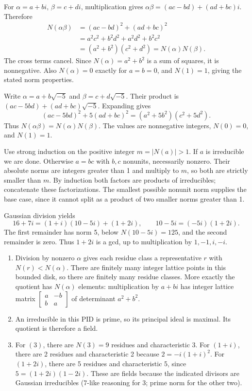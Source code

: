 For $\alpha=a+bi$, $\beta=c+di$, multiplication gives $\alpha\beta=(ac-bd)+(ad+bc)i$. Therefore
\begin{align*}
N(\alpha\beta)&=(ac-bd)^2+(ad+bc)^2\\
&=a^2c^2+b^2d^2+a^2d^2+b^2c^2\\
&=(a^2+b^2)(c^2+d^2)=N(\alpha)N(\beta).
\end{align*}
The cross terms cancel. Since $N(\alpha)=a^2+b^2$ is a sum of squares, it is nonnegative. Also $N(\alpha)=0$ exactly for $a=b=0$, and $N(1)=1$, giving the stated norm properties.

Write $\alpha=a+b\sqrt{-5}$ and $\beta=c+d\sqrt{-5}$. Their product is $(ac-5bd)+(ad+bc)\sqrt{-5}$. Expanding gives
\[(ac-5bd)^2+5(ad+bc)^2=(a^2+5b^2)(c^2+5d^2).\]
Thus $N(\alpha\beta)=N(\alpha)N(\beta)$. The values are nonnegative integers, $N(0)=0$, and $N(1)=1$.

Use strong induction on the positive integer $m=|N(a)|>1$. If $a$ is irreducible we are done. Otherwise $a=bc$ with $b,c$ nonunits, necessarily nonzero. Their absolute norms are integers greater than 1 and multiply to $m$, so both are strictly smaller than $m$. By induction both factors are products of irreducibles; concatenate these factorizations. The smallest possible nonunit norm supplies the base case, since it cannot split as a product of two smaller norms greater than 1.

Gaussian division yields
\[16+7i=(1+i)(10-5i)+(1+2i),\qquad 10-5i=(-5i)(1+2i).\]
The first remainder has norm 5, below $N(10-5i)=125$, and the second remainder is zero. Thus $1+2i$ is a gcd, up to multiplication by $1,-1,i,-i$.

\begin{enumerate}[label=(\alph*)]
\item Division by nonzero $\alpha$ gives each residue class a representative $r$ with $N(r)<N(\alpha)$. There are finitely many integer lattice points in this bounded disk, so there are finitely many residue classes. More exactly the quotient has $N(\alpha)$ elements: multiplication by $a+bi$ has integer lattice matrix $\left[\begin{smallmatrix}a&-b\\b&a\end{smallmatrix}\right]$ of determinant $a^2+b^2$.
\item An irreducible in this PID is prime, so its principal ideal is maximal. Its quotient is therefore a field.
\item For $(3)$, there are $N(3)=9$ residues and characteristic 3. For $(1+i)$, there are 2 residues and characteristic 2 because $2=-i(1+i)^2$. For $(1+2i)$, there are 5 residues and characteristic 5, since $5=(1+2i)(1-2i)$. These are fields because the indicated divisors are Gaussian irreducibles (7-like reasoning for 3; prime norm for the other two).
\end{enumerate}

